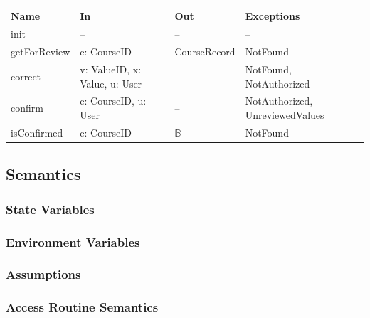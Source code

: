 \documentclass[12pt, titlepage]{article}
\newcommand{\mref}[1]{M\ref{MG-#1}}
\begin{document}
\begin{center}\small
\begin{tabular}{>{\raggedright\arraybackslash}p{3.3cm} >{\raggedright\arraybackslash}p{4.1cm} >{\raggedright\arraybackslash}p{3.4cm} >{\raggedright\arraybackslash}p{4.0cm}}
\hline
\textbf{Name} & \textbf{In} & \textbf{Out} & \textbf{Exceptions} \\
\hline
init & -- & -- & -- \\
getForReview & c: CourseID & CourseRecord & NotFound \\
correct & v: ValueID, x: Value, u: User & -- & NotFound, NotAuthorized \\
confirm & c: CourseID, u: User & -- & NotAuthorized, UnreviewedValues \\
isConfirmed & c: CourseID & $\mathbb{B}$ & NotFound \\
\hline
\end{tabular}
\end{center}

\subsection{Semantics}

\subsubsection{State Variables}


\subsubsection{Environment Variables}


\subsubsection{Assumptions}


\subsubsection{Access Routine Semantics}
\end{document}
